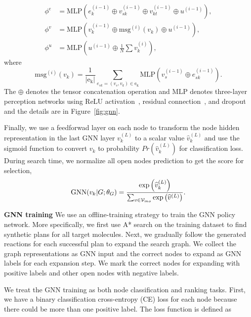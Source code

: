 \documentclass[sigconf]{acmart}
\begin{document}
\begin{align}
    \phi^e &= \text{MLP}\left(e^{(i-1)}_k \oplus v^{(i-1)}_{sk} \oplus v^{(i-1)}_{kt} \oplus u^{(i-1)}\right), \label{eq:mlp1}\\
    \phi^v &= \text{MLP}\left( v^{(i-1)}_k \oplus \text{msg}^{(i)}(v_k) \oplus u^{(i-1)} \right), \label{eq:mlp2}\\
    \phi^{u} &= \text{MLP}\left(u^{(i-1)} \oplus \frac{1}{N}\sum{v^{(i)}_k} \right), \label{eq:mlp3}
\end{align}
where
\begin{equation}
    \text{msg}^{(i)}(v_k) = \frac{1}{|\mathrm{e_k}|}\sum_{e_{sk}=(v_s, v_k) \in \mathrm{e_k}} \text{MLP}\left(v^{(i-1)}_s \oplus e^{(i-1)}_{sk}\right).
\end{equation}
The $\oplus$ denotes the tensor concatenation operation and $\text{MLP}$ denotes three-layer perception networks using ReLU activation~\cite{agarap2018deep}, residual connection~\cite{he2016}, and dropout~\cite{Srivastava2014} and the details are in Figure~\ref{fig:gnn}.

Finally, we use a feedforwad layer on each node to transform the node hidden representation in the last GNN layer $v_k^{(L)}$ to a scalar value $\widehat{v}^{(L)}_k$ and use the sigmoid function to convert $v_k$ to probability $Pr(\widehat{v}^{(L)}_k)$ for classification loss.
During search time, we normalize all open nodes prediction to get the score for selection,
\begin{equation}
    \text{GNN}(v_k|G;\theta_G) = \frac{\exp\left(\widehat{v}_k^{(L)}\right)}{\sum_{v\in\mathcal{V}_{mo}}\exp\left(\widehat{v}^{(L)}\right)}.
\end{equation}

\noindent\textbf{GNN training}
We use an offline-training strategy to train the GNN policy network.
More specifically, we first use A* search on the training dataset to find synthetic plans for all target molecules.
Next, we gradually follow the generated reactions for each successful plan to expand the search graph.
We collect the graph representations as GNN input and the correct nodes to expand as GNN labels for each expansion step.  
We mark the correct nodes for expanding with positive labels and other open nodes with negative labels.

We treat the GNN training as both node classification and ranking tasks.
First, we have a binary classification cross-entropy (CE) loss for each node because there could be more than one positive label.
The loss function is defined as
\end{document}
